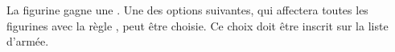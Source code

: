 
\newcommand{\royalpegasusrule}{%
La figurine gagne +1 Attaque et sa taille de socle passe à \unit{50x50}{\milli\meter}. 
}














\startarmyspecialrules

\armyspecialruleentry{\theblessing}

La figurine gagne une . Une des options suivantes, qui affectera toutes les figurines avec la règle \theblessing{}, peut être choisie. Ce choix doit être inscrit sur la liste d'armée.

